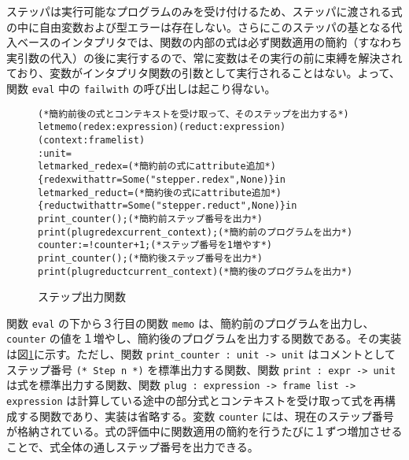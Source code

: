 ステッパは実行可能なプログラムのみを受け付けるため、ステッパに渡される式の中に自由変数および型エラーは存在しない。さらにこのステッパの基となる代入ベースのインタプリタでは、関数の内部の式は必ず関数適用の簡約（すなわち実引数の代入）の後に実行するので、常に変数はその実行の前に束縛を解決されており、変数がインタプリタ関数の引数として実行されることはない。よって、関数 \texttt{eval} 中の \texttt{failwith} の呼び出しは起こり得ない。

\begin{figure}[t]
\begin{alltt}
(* 簡約前後の式とコンテキストを受け取って、そのステップを出力する *)
let memo (redex : expression) (reduct : expression) (context : frame list)
  : unit =
  let marked\_redex =                             (* 簡約前の式に attribute 追加 *)
    \{redex with attr = Some ("stepper.redex", None)\} in
  let marked\_reduct =                            (* 簡約後の式に attribute 追加 *)
    \{reduct with attr = Some ("stepper.reduct", None)\} in
  print\_counter ();                                  (* 簡約前ステップ番号を出力 *)
  print (plug redex current\_context);                (* 簡約前のプログラムを出力 *)
  counter := !counter + 1;                           (* ステップ番号を 1 増やす *)
  print\_counter ();                                  (* 簡約後ステップ番号を出力 *)
  print (plug reduct current\_context)                (* 簡約後のプログラムを出力 *)
\end{alltt}
\caption{ステップ出力関数}
\label{figure:memo}
\end{figure}

関数 \texttt{eval} の下から３行目の関数 \texttt{memo} は、簡約前のプログラムを出力し、 \texttt{counter} の値を１増やし、簡約後のプログラムを出力する関数である。その実装は図\ref{figure:memo}に示す。ただし、関数 \texttt{print\_counter : unit -> unit} はコメントとしてステップ番号 \texttt{(* Step n *)} を標準出力する関数、関数 \texttt{print : expr -> unit} は式を標準出力する関数、関数 \texttt{plug : expression -> frame list -> expression} は計算している途中の部分式とコンテキストを受け取って式を再構成する関数であり、実装は省略する。変数 \texttt{counter} には、現在のステップ番号が格納されている。式の評価中に関数適用の簡約を行うたびに１ずつ増加させることで、式全体の通しステップ番号を出力できる。
